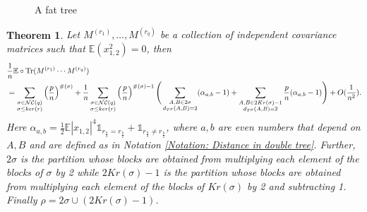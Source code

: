 \documentclass{article}
\newtheorem{theorem}             {Theorem}
\theoremstyle{definition}
\newcommand{\E}{\mathbb{E}}
\newcommand{\NC}{\mathcal{NC}}
\newcommand{\Tr}{\text{Tr}}
\newcommand{\I}{\mathds{1}}
\begin{document}
\begin{figure}
\centering
    \caption{A fat tree}
    \label{fig:fat-tree}
\end{figure}

\begin{theorem}\label{Lemma: Expansion of moments 5}
Let $M^{(r_1)},\dots, M^{(r_q)}$ be a collection of independent covariance matrices such that $\E(x_{1,2}^2)=0$, then
\begin{align*}
&\frac{1}{n}\E\circ \textup{\Tr}(M^{(r_1)}\cdots M^{(r_q)})\\
&=\sum_{\substack{\sigma\in \NC(q) \\ \sigma\leq ker(r)}}\left(\frac{p}{n}\right)^{\#(\sigma)}+ 
\frac{1}{n}\sum_{\substack{\sigma\in \NC(q) \\ \sigma\leq ker(r)}}\left(\frac{p}{n}\right)^{\#(\sigma)-1}\Bigg(\sum_{\substack{A,B\in 2\sigma \\ d_{T^\rho}(A,B)=2}}(\alpha_{a,b}-1)+\sum_{\substack{A,B\in 2Kr(\sigma)-1 \\ d_{T^\rho}(A,B)=2}}\frac{p}{n}(\alpha_{a,b}-1)\Bigg) +O(\frac{1}{n^2}).
\end{align*}
Here $\alpha_{a,b}=\frac{1}{2}\E|x_{1,2}|^4 \I_{r_{\frac{a}{2}}=r_{\frac{b}{2}}}+\I_{r_{\frac{a}{2}}\neq r_{\frac{b}{2}}}$, where $a,b$ are even numbers that depend on $A,B$ and are defined as in Notation \ref{Notation: Distance in double tree}. Further, $2\sigma$ is the partition whose blocks are obtained from multiplying each element of the blocks of $\sigma$ by 2 while $2Kr(\sigma)-1$ is the partition whose blocks are obtained from multiplying each element of the blocks of $Kr(\sigma)$ by 2 and subtracting 1. Finally $\rho=2\sigma\cup (2Kr(\sigma)-1)$.
\end{theorem}
\end{document}
